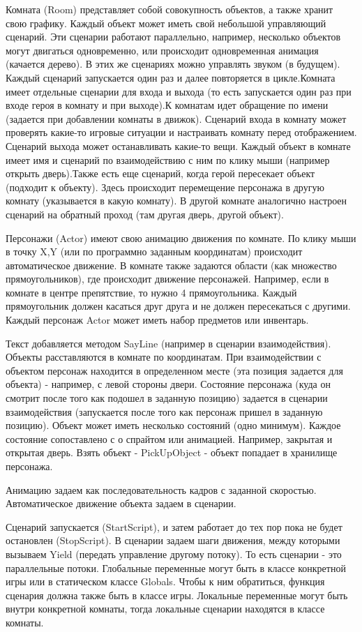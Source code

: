 Комната (Room) представляет собой совокупность объектов, а также хранит свою графику. Каждый объект может иметь свой небольшой управляющий сценарий. Эти сценарии работают параллельно, например, несколько объектов могут двигаться одновременно, или происходит одновременная анимация (качается дерево). В этих же сценариях можно управлять звуком (в будущем). Каждый сценарий запускается один раз и далее повторяется в цикле.Комната имеет отдельные сценарии для входа и выхода (то есть запускается один раз при входе героя в комнату и при выходе).К комнатам идет обращение по имени (задается при добавлении комнаты в движок).
Сценарий входа в комнату может проверять какие-то игровые ситуации и настраивать комнату перед отображением. Сценарий выхода может останавливать какие-то вещи.
Каждый объект в комнате имеет имя и сценарий по взаимодействию с ним по клику мыши (например открыть дверь).Также есть еще сценарий, когда герой пересекает объект (подходит к объекту). Здесь происходит перемещение персонажа в другую комнату (указывается в какую комнату). В другой комнате аналогично настроен сценарий на обратный проход (там другая дверь, другой объект).

Персонажи (Actor) имеют свою анимацию движения по комнате. По клику мыши в точку X,Y (или по программно заданным координатам) происходит автоматическое движение.
В комнате также задаются области (как множество прямоугольников), где происходит движение персонажей. Например, если в комнате в центре препятствие, то нужно 4 прямоугольника. Каждый прямоугольник должен касаться друг друга и не должен пересекаться с другими.
Каждый персонаж Actor может иметь набор предметов или инвентарь.

Текст добавляется методом SayLine (например в сценарии взаимодействия).
Объекты расставляются в комнате по координатам. При взаимодействии с объектом персонаж находится в определенном месте (эта позиция задается для объекта) - например, с левой стороны двери. Состояние персонажа (куда он смотрит после того как подошел в заданную позицию) задается в сценарии взаимодействия (запускается после того как персонаж пришел в заданную позицию).
Объект может иметь несколько состояний (одно минимум). Каждое состояние сопоставлено с о спрайтом или анимацией. Например, закрытая и открытая дверь.
Взять объект - PickUpObject - объект попадает в хранилище персонажа.

Анимацию задаем как последовательность кадров с заданной скоростью.
Автоматическое движение объекта задаем в сценарии.

Сценарий запускается (StartScript), и затем работает до тех пор пока не будет остановлен (StopScript).
В сценарии задаем шаги движения, между которыми вызываем Yield (передать управление другому потоку). То есть сценарии - это параллельные потоки.
Глобальные переменные могут быть в классе конкретной игры или в статическом классе Globals. Чтобы к ним обратиться, функция сценария должна также быть в классе игры. Локальные переменные могут быть внутри конкретной комнаты, тогда локальные сценарии находятся в классе комнаты.

